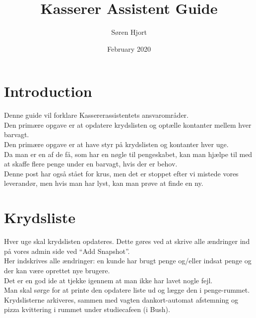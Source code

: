 

\title{Kasserer Assistent Guide}
\author{Søren Hjort}
\date{February 2020}



\maketitle

\section{Introduction}
Denne guide vil forklare Kassererassistentets ansvarområder.
\\
Den primære opgave er at opdatere krydslisten og optælle kontanter mellem hver
barvagt.
\\
Den primære opgave er at have styr på krydslisten og kontanter hver uge.
\\
Da man er en af de få, som har en nøgle til pengeskabet, kan man hjælpe til med at
skaffe flere penge under en barvagt, hvis der er behov.
\\
Denne post har også stået for krus, men det er stoppet efter vi mistede vores
leverandør, men hvis man har lyst, kan man prøve at finde en ny.

\section{Krydsliste}
Hver uge skal krydslisten opdateres. Dette gøres ved at skrive alle ændringer
ind på vores admin side ved ``Add Snapshot''.
\\
Her indskrives alle ændringer: en kunde har brugt penge og/eller indsat penge og
der kan være oprettet nye brugere.
\\
Det er en god ide at tjekke igennem at man ikke har lavet nogle fejl.
\\
Man skal sørge for at printe den opdatere liste ud og lægge den i penge-rummet.
\\
Krydslisterne arkiveres, sammen med vagten dankort-automat afstemning og pizza
kvittering i rummet under studiecafeen (i Bush).

